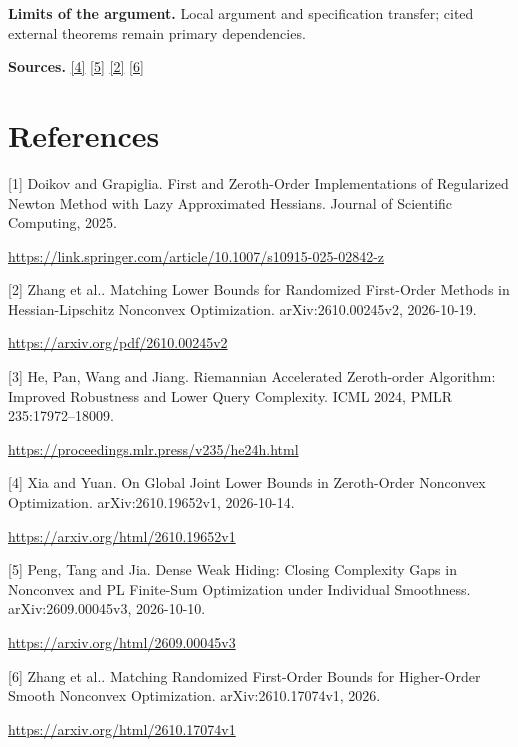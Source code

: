 \documentclass[10pt,a4paper]{article}
\begin{document}
\textbf{Limits of the argument.} Local argument and specification transfer; cited external theorems remain primary dependencies.

\textbf{Sources.} \href{https://arxiv.org/html/2610.19652v1}{[4]} \href{https://arxiv.org/html/2609.00045v3}{[5]} \href{https://arxiv.org/pdf/2610.00245v2}{[2]} \href{https://arxiv.org/html/2610.17074v1}{[6]}

\section{References}
[1] Doikov and Grapiglia. First and Zeroth-Order Implementations of Regularized Newton Method with Lazy Approximated Hessians. Journal of Scientific Computing, 2025.

\url{https://link.springer.com/article/10.1007/s10915-025-02842-z}

[2] Zhang et al.. Matching Lower Bounds for Randomized First-Order Methods in Hessian-Lipschitz Nonconvex Optimization. arXiv:2610.00245v2, 2026-10-19.

\url{https://arxiv.org/pdf/2610.00245v2}

[3] He, Pan, Wang and Jiang. Riemannian Accelerated Zeroth-order Algorithm: Improved Robustness and Lower Query Complexity. ICML 2024, PMLR 235:17972--18009.

\url{https://proceedings.mlr.press/v235/he24h.html}

[4] Xia and Yuan. On Global Joint Lower Bounds in Zeroth-Order Nonconvex Optimization. arXiv:2610.19652v1, 2026-10-14.

\url{https://arxiv.org/html/2610.19652v1}

[5] Peng, Tang and Jia. Dense Weak Hiding: Closing Complexity Gaps in Nonconvex and PL Finite-Sum Optimization under Individual Smoothness. arXiv:2609.00045v3, 2026-10-10.

\url{https://arxiv.org/html/2609.00045v3}

[6] Zhang et al.. Matching Randomized First-Order Bounds for Higher-Order Smooth Nonconvex Optimization. arXiv:2610.17074v1, 2026.

\url{https://arxiv.org/html/2610.17074v1}
\end{document}
